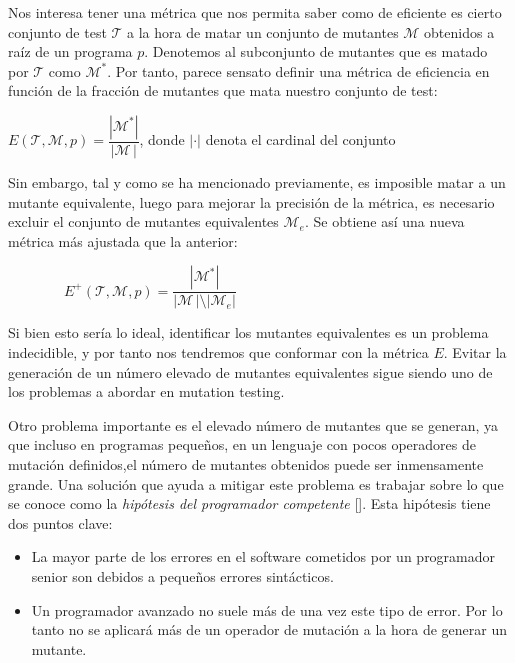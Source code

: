 Nos interesa tener una métrica que nos permita saber como de eficiente es cierto conjunto de test $\mathcal{T}$ a la hora de matar un conjunto de mutantes $\mathcal{M}$ obtenidos a raíz de un programa $p$. Denotemos al subconjunto de mutantes que es matado por $\mathcal{T}$ como $\mathcal{M}^*$. Por tanto, parece sensato definir una métrica de eficiencia en función de la fracción de mutantes que mata nuestro conjunto de test:
\begin{center}
$E(\mathcal{T},\mathcal{M},p) = \dfrac{|\mathcal{M}^*|}{|\mathcal{M} \,|}$, donde $|\cdot|$ denota el cardinal del conjunto
\end{center}

Sin embargo, tal y como se ha mencionado previamente, es imposible matar a un mutante equivalente, luego para mejorar la precisión de la métrica, es necesario excluir el conjunto de mutantes equivalentes $\mathcal{M}_e$. Se obtiene así una nueva métrica más ajustada que la anterior:

$\hspace{48pt}E^+(\mathcal{T},\mathcal{M},p) = \dfrac{|\mathcal{M}^*|}{|\mathcal{M} \,|\setminus|\mathcal{M}_e|}$

Si bien esto sería lo ideal, identificar los mutantes equivalentes es un problema indecidible, y por tanto nos tendremos que conformar con la métrica $E$. Evitar la generación de un número elevado de mutantes equivalentes sigue siendo uno de los problemas a abordar en mutation testing. 

Otro problema importante es el elevado número de mutantes que se generan, ya que incluso en programas pequeños, en un lenguaje con pocos operadores de mutación definidos,el número de mutantes obtenidos puede ser inmensamente grande. Una solución que ayuda a mitigar este problema es trabajar sobre lo que se conoce como la \textit{hipótesis del programador competente} [\cite{demillo1978hints}]. Esta hipótesis tiene dos puntos clave:
\begin{itemize}
\item La mayor parte de los errores en el software cometidos por un programador senior son debidos a pequeños errores sintácticos.
\item Un programador avanzado no suele más de una vez este tipo de error. Por lo tanto no se aplicará más de un operador de mutación a la hora de generar un mutante.
\end{itemize}

